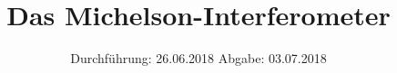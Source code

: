 
\usepackage{longtable}
\usepackage{wrapfig}
\usepackage{ dsfont }
\subject{VERSUCH 401}
\title{Das Michelson-Interferometer}
\date{%
  \hspace{-2.5em}
  Durchführung: 26.06.2018
  \hspace{4em}
  Abgabe: 03.07.2018
}


  \setlength{\parindent}{0em}
  \maketitle
  \thispagestyle{empty}
  \newpage
  \tableofcontents
  \newpage





\printbibliography{}



